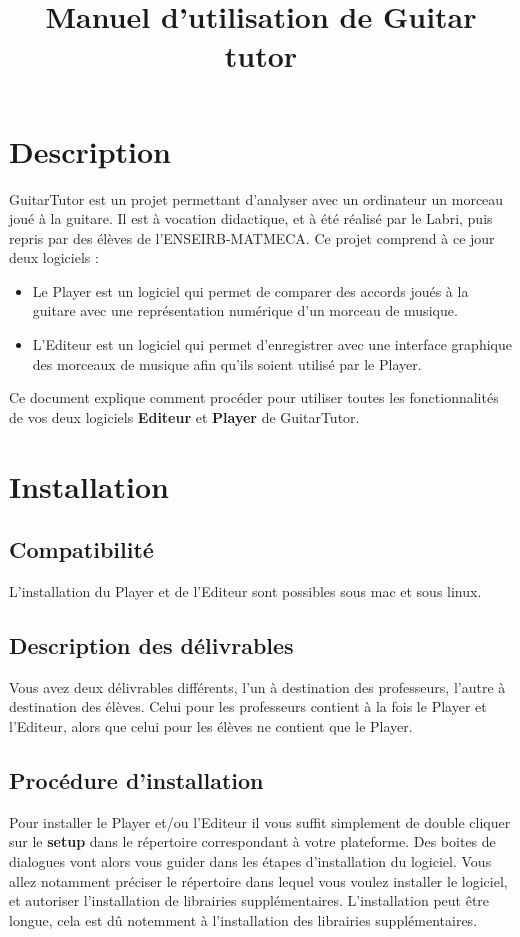 \documentclass[a4paper]{article}
\begin{document}
\title{Manuel d'utilisation de Guitar tutor}

\maketitle

\tableofcontents{}
\newpage

\section{Description}
GuitarTutor est un projet permettant d'analyser avec un ordinateur un morceau joué à la guitare. Il est à vocation didactique, et à été réalisé par le Labri, 
puis repris par des élèves de l'ENSEIRB-MATMECA. Ce projet comprend à ce jour deux logiciels :
\begin{itemize}
\item  Le Player est un logiciel qui permet de comparer des accords joués à la guitare avec une représentation numérique d'un morceau de musique.
\item  L'Editeur est un logiciel qui permet d'enregistrer avec une interface graphique des morceaux de musique afin qu'ils soient utilisé par le Player.
\end{itemize}
Ce document  explique comment procéder pour utiliser toutes les fonctionnalités de vos deux logiciels \textbf{Editeur} et \textbf{Player} de GuitarTutor.
\newpage

\section{Installation}

\subsection{Compatibilité}
L’installation du Player et de l’Editeur sont possibles sous mac et sous linux.
\subsection{Description des délivrables}
Vous avez deux délivrables différents, l'un à destination des professeurs, l'autre à destination des élèves. 
Celui pour les professeurs contient à la fois le Player et l'Editeur, alors que celui pour les élèves ne contient que le Player.
\subsection{Procédure d'installation}
Pour installer le Player et/ou l'Editeur il vous suffit simplement de double cliquer sur le \textbf{setup} dans le répertoire correspondant à votre plateforme. 
Des boites de dialogues vont alors vous guider dans les étapes d'installation du logiciel. 
Vous allez notamment préciser le répertoire dans lequel vous voulez installer le logiciel, et autoriser l'installation de librairies supplémentaires.
L'installation peut être longue, cela est dû notemment à l'installation des librairies supplémentaires.
\end{document}
